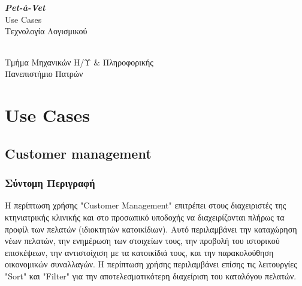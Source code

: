 \documentclass[12pt,a4paper,twoside]{book}
\renewcommand{\headrulewidth}{0pt} %
\renewcommand{\headrulewidth}{0pt}
\let\oldtableofcontents\tableofcontents
\renewcommand{\tableofcontents}{%
    \clearpage
    \thispagestyle{empty}
    \pagestyle{tocstyle}
    \oldtableofcontents %
    \clearpage
    \pagestyle{fancy}
    \fancyhead[LE]{\thepage} %
    \fancyhead[CE]{\leftmark} %
    \fancyhead[RE]{ΚΕΦ. \thechapter} %

    \fancyhead[LO]{\thesection} %
    \fancyhead[CO]{\rightmark} %
    \fancyhead[RO]{\thepage} %

    \renewcommand{\headrulewidth}{0.4pt} %

    \renewcommand{\chaptermark}[1]{\markboth{##1}{}}
    \renewcommand{\sectionmark}[1]{\markright{##1}}
}
\begin{document}
\let\cleardoublepage\clearpage


\begin{titlepage}
  \vspace*{8cm}
  \begin{center}
    {\LARGE \textbf{\textit{Pet-à-Vet}}}\\ %
    \vspace*{0.5cm}
    {\large Use Cases}\\
    {\large Τεχνολογία Λογισμικού}
    \vspace*{5cm}
    \\
    \vspace*{1cm}
    \begin{tabular}{l l l}
    \end{tabular}

    \vspace*{1cm}

    {\normalsize Τμήμα Μηχανικών Η/Υ \& Πληροφορικής}
    \\
    {\normalsize Πανεπιστήμιο Πατρών}
    \\
  \end{center}
  \thispagestyle{empty} %
\end{titlepage}

\tableofcontents

\printindex

\chapter{Use Cases}

\section{Customer management}

\subsection{Σύντομη Περιγραφή}
Η περίπτωση χρήσης "Customer Management" επιτρέπει στους διαχειριστές της κτηνιατρικής κλινικής και στο προσωπικό υποδοχής να διαχειρίζονται πλήρως τα προφίλ των πελατών (ιδιοκτητών κατοικίδιων). Αυτό περιλαμβάνει την καταχώρηση νέων πελατών, την ενημέρωση των στοιχείων τους, την προβολή του ιστορικού επισκέψεων, την αντιστοίχιση με τα κατοικίδιά τους, και την παρακολούθηση οικονομικών συναλλαγών. Η περίπτωση χρήσης περιλαμβάνει επίσης τις λειτουργίες "Sort" και "Filter" για την αποτελεσματικότερη διαχείριση του καταλόγου πελατών. %
\end{document}
